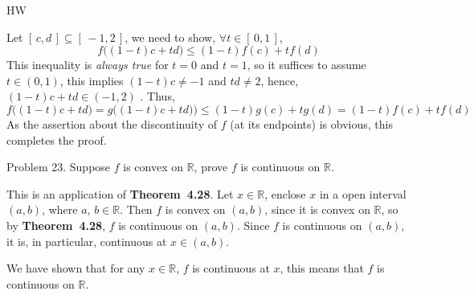 \documentclass[12pt]{article}
\begin{document}
\begin{exam}{HW}
\begin{problem}[4]
\begin{solution}
Let $[\,c,d\,]\subseteq [\,-1,2\,]$, we need to show, $\forall t \in [\,0,1\,]$,
$$
    f\bigl(  (1-t)c + td \bigr) \le (1-t) f(c) + tf(d)
$$
This inequality is \emph{always true} for $t=0$ and $t=1$, so it suffices to assume
$t\in(0,1)$, this implies $(1-t)c \ne -1$ and $ td \ne 2$, hence, $(1-t)c + td\in(-1,2)$ . Thus,
$$
    f\bigl(  (1-t)c + td \bigr) = g\bigl(  (1-t)c + td \bigr)) \le (1-t) g(c) + tg(d) = (1-t) f(c) + tf(d)
$$
As the assertion about the discontinuity of $f$ (at its endpoints) is obvious, this completes the proof.
\end{solution}
\end{problem}

\begin{problem}[3]
Problem 23. Suppose $f$ is convex on $\mathbb R$, prove $f$ is continuous on $\mathbb R$.
\begin{solution}
This is an application of \textbf{Theorem~4.28}. Let $x\in\mathbb R$, enclose $x$ in a open
interval $(a,b)$, where $a$, $b\in\mathbb R$. Then $f$ is convex on $(a,b)$, since it is convex
on $\mathbb R$, so by  \textbf{Theorem~4.28}, $f$ is continuous on $(a,b)$. Since $f$ is continuous
on $(a,b)$, it is, in particular, continuous at $x\in(a,b)$.

We have shown that for any $x\in\mathbb R$, $f$ is continuous at
$x$, this means that $f$ is continuous on $\mathbb R$.
\end{solution}
\end{problem}
\end{exam}
\end{document}
